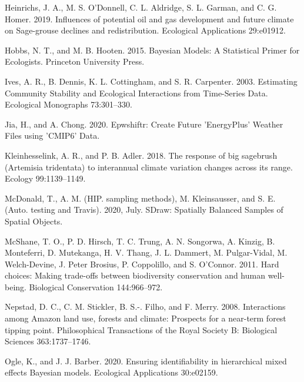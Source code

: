 \documentclass[
  12pt,
]{article}
\newlength{\cslhangindent}
\newenvironment{CSLReferences}[2] %
 {%
  \setlength{\parindent}{0pt}
  \ifodd #1 \everypar{\setlength{\hangindent}{\cslhangindent}}\ignorespaces\fi
  \ifnum #2 > 0
  \setlength{\parskip}{#2\baselineskip}
  \fi
 }%
 {}
\begin{document}
\begin{CSLReferences}{1}{0}
\leavevmode{}%
Heinrichs, J. A., M. S. O'Donnell, C. L. Aldridge, S. L. Garman, and C. G. Homer. 2019. Influences of potential oil and gas development and future climate on {Sage}-grouse declines and redistribution. Ecological Applications 29:e01912.

\leavevmode{}%
Hobbs, N. T., and M. B. Hooten. 2015. Bayesian {Models}: {A} {Statistical} {Primer} for {Ecologists}. Princeton University Press.

\leavevmode{}%
Ives, A. R., B. Dennis, K. L. Cottingham, and S. R. Carpenter. 2003. Estimating {Community} {Stability} and {Ecological} {Interactions} from {Time}-{Series} {Data}. Ecological Monographs 73:301--330.

\leavevmode{}%
Jia, H., and A. Chong. 2020. Epwshiftr: {Create} {Future} '{EnergyPlus}' {Weather} {Files} using '{CMIP6}' {Data}.

\leavevmode{}%
Kleinhesselink, A. R., and P. B. Adler. 2018. The response of big sagebrush ({Artemisia} tridentata) to interannual climate variation changes across its range. Ecology 99:1139--1149.

\leavevmode{}%
McDonald, T., A. M. (HIP. sampling methods), M. Kleinsausser, and S. E. (Auto. testing and Travis). 2020, July. {SDraw}: {Spatially} {Balanced} {Samples} of {Spatial} {Objects}.

\leavevmode{}%
McShane, T. O., P. D. Hirsch, T. C. Trung, A. N. Songorwa, A. Kinzig, B. Monteferri, D. Mutekanga, H. V. Thang, J. L. Dammert, M. Pulgar-Vidal, M. Welch-Devine, J. Peter Brosius, P. Coppolillo, and S. O'Connor. 2011. Hard choices: {Making} trade-offs between biodiversity conservation and human well-being. Biological Conservation 144:966--972.

\leavevmode{}%
Nepstad, D. C., C. M. Stickler, B. S.-. Filho, and F. Merry. 2008. Interactions among {Amazon} land use, forests and climate: Prospects for a near-term forest tipping point. Philosophical Transactions of the Royal Society B: Biological Sciences 363:1737--1746.

\leavevmode{}%
Ogle, K., and J. J. Barber. 2020. Ensuring identifiability in hierarchical mixed effects {Bayesian} models. Ecological Applications 30:e02159.


\end{CSLReferences}
\end{document}
